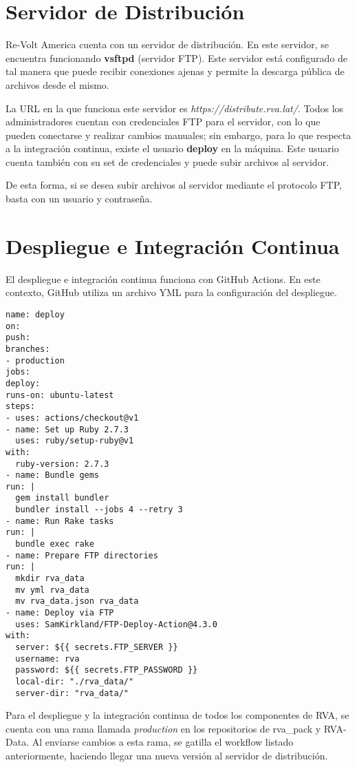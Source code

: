 \newpage

\section{Servidor de Distribución}
Re-Volt America cuenta con un servidor de distribución. En este servidor, se encuentra funcionando \textbf{vsftpd} (servidor FTP). Este servidor está configurado de tal manera que puede recibir conexiones ajenas y permite la descarga pública de archivos desde el mismo.

La URL en la que funciona este servidor es \textit{https://distribute.rva.lat/}. Todos los administradores cuentan con credenciales FTP para el servidor, con lo que pueden conectarse y realizar cambios manuales; sin embargo, para lo que respecta a la integración continua, existe el usuario \textbf{deploy} en la máquina. Este usuario cuenta también con su set de credenciales y puede subir archivos al servidor.

De esta forma, si se desea subir archivos al servidor mediante el protocolo FTP, basta con un usuario y contraseña.

\newpage

\section{Despliegue e Integración Continua}
El despliegue e integración continua funciona con GitHub Actions. En este contexto, GitHub utiliza un archivo YML para la configuración del despliegue.

\begin{longlisting}
  \begin{verbatim}  
name: deploy
on:
push:
branches:
- production
jobs:
deploy:
runs-on: ubuntu-latest
steps:
- uses: actions/checkout@v1
- name: Set up Ruby 2.7.3
  uses: ruby/setup-ruby@v1
with:
  ruby-version: 2.7.3
- name: Bundle gems
run: |
  gem install bundler
  bundler install --jobs 4 --retry 3
- name: Run Rake tasks
run: |
  bundle exec rake
- name: Prepare FTP directories
run: |
  mkdir rva_data
  mv yml rva_data
  mv rva_data.json rva_data
- name: Deploy via FTP
  uses: SamKirkland/FTP-Deploy-Action@4.3.0
with:
  server: ${{ secrets.FTP_SERVER }}
  username: rva
  password: ${{ secrets.FTP_PASSWORD }}
  local-dir: "./rva_data/"
  server-dir: "rva_data/"
  \end{verbatim}
\end{longlisting}

\newpage

Para el despliegue y la integración continua de todos los componentes de RVA, se cuenta con una rama llamada \textit{production} en los repositorios de rva\_pack y RVA-Data. Al enviarse cambios a esta rama, se gatilla el workflow listado anteriormente, haciendo llegar una nueva versión al servidor de distribución.